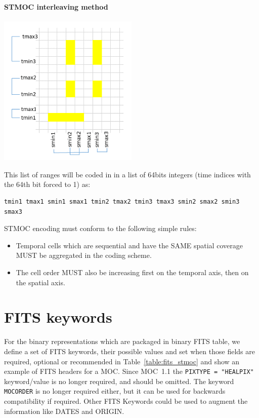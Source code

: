 \documentclass[11pt,a4paper]{ivoa}
\begin{document}
\paragraph{STMOC interleaving method}
\begin{adjustbox}{center,caption={STMOC encoding with two independent
      numbering system},
    label={fig:stmocbin-encoding},nofloat=figure,vspace=\bigskipamount}
\includegraphics[width=0.5\textwidth]{STMOCbin.png}
\end{adjustbox}

\par\noindent
This list of ranges will be  coded in in a list of 64bits integers
(time indices with the 64th bit forced to 1) as:
\begin{lstlisting}[]
   tmin1 tmax1 smin1 smax1 tmin2 tmax2 tmin3 tmax3 smin2 smax2 smin3 smax3
\end{lstlisting}

STMOC encoding must conform to the following simple rules:
\begin{itemize}
\item{Temporal cells which are sequential and have the SAME
  spatial coverage MUST be aggregated in the coding scheme.}
\item{The cell order MUST also be increasing first on the
  temporal axis, then on the spatial axis.}
\end{itemize}


\section{FITS keywords}
\label{sec:fits-key-moc} 
For the binary representations which are packaged in binary FITS table,
we define a set of FITS keywords, their possible values and set when
those fields are required, optional or recommended in
Table~\ref{table:fits_stmoc} and show an example of FITS headers for a MOC.
Since MOC~1.1 \citep{2019ivoa.spec.1007F} the {\tt PIXTYPE = "HEALPIX"}
keyword/value is no longer required, and should be omitted. 
The keyword {\tt MOCORDER} is no longer required either, but it can be used for
backwards compatibility if required.
Other FITS Keywords could be used to augment the information like DATES and ORIGIN. 
 
\end{document}
